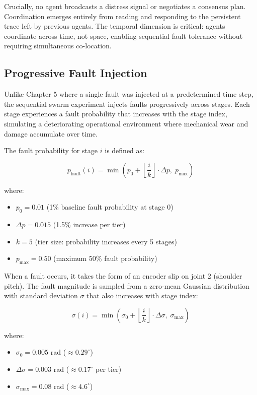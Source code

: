﻿\documentclass[12pt,a4paper,oneside]{report}
\begin{document}
Crucially, no agent broadcasts a distress signal or negotiates a consensus plan. Coordination emerges entirely from reading and responding to the persistent trace left by previous agents. The temporal dimension is critical: agents coordinate across time, not space, enabling sequential fault tolerance without requiring simultaneous co-location.

\subsection{Progressive Fault Injection}

Unlike Chapter 5 where a single fault was injected at a predetermined time step, the sequential swarm experiment injects faults progressively across stages. Each stage experiences a fault probability that increases with the stage index, simulating a deteriorating operational environment where mechanical wear and damage accumulate over time.

The fault probability for stage $i$ is defined as:

\begin{equation}
p_{\text{fault}}(i) = \min\left(p_0 + \left\lfloor \frac{i}{k} \right\rfloor \cdot \Delta p,\; p_{\text{max}}\right)
\end{equation}

where:
\begin{itemize}
    \item $p_0 = 0.01$ (1\% baseline fault probability at stage 0)
    \item $\Delta p = 0.015$ (1.5\% increase per tier)
    \item $k = 5$ (tier size: probability increases every 5 stages)
    \item $p_{\text{max}} = 0.50$ (maximum 50\% fault probability)
\end{itemize}

When a fault occurs, it takes the form of an encoder slip on joint 2 (shoulder pitch). The fault magnitude is sampled from a zero-mean Gaussian distribution with standard deviation $\sigma$ that also increases with stage index:

\begin{equation}
\sigma(i) = \min\left(\sigma_0 + \left\lfloor \frac{i}{k} \right\rfloor \cdot \Delta \sigma,\; \sigma_{\text{max}}\right)
\end{equation}

where:
\begin{itemize}
    \item $\sigma_0 = 0.005$ rad ($\approx 0.29^\circ$)
    \item $\Delta \sigma = 0.003$ rad ($\approx 0.17^\circ$ per tier)
    \item $\sigma_{\text{max}} = 0.08$ rad ($\approx 4.6^\circ$)
\end{itemize}
\end{document}
